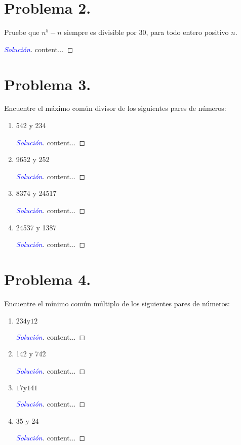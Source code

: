 \documentclass[a4paper,12pt]{article}
\newenvironment{solution}
  {\renewcommand\qedsymbol{$\square$}\begin{proof}[\textcolor{blue}{Solución}]}
  {\end{proof}}
\begin{document}
\section{Problema 2.} Pruebe que $n^{5}-n$ siempre es divisible por 30, para todo entero positivo $n$.
\begin{solution}
	content...
\end{solution}
\section{Problema 3.} Encuentre el máximo común divisor de los siguientes pares de números:
\begin{enumerate}[label=\alph*.]
	\item 542 y 234
	\begin{solution}
		content...
	\end{solution}
	\item  9652 y 252
	\begin{solution}
		content...
	\end{solution}
	\item 8374 y 24517
	\begin{solution}
		content...
	\end{solution}
	\item 24537 y 1387
	\begin{solution}
		content...
	\end{solution}
\end{enumerate}

\section{Problema 4.} Encuentre el mínimo común múltiplo de los siguientes pares de números:
\begin{enumerate}[label=\alph*.]
	\item $234 \mathrm{y} 12$
	\begin{solution}
		content...
	\end{solution}
	\item 142 y 742
	\begin{solution}
		content...
	\end{solution}
	\item $17 \mathrm{y} 141$
	\begin{solution}
		content...
	\end{solution}
	\item 35 y 24
	\begin{solution}
		content...
	\end{solution}
\end{enumerate}
\end{document}
